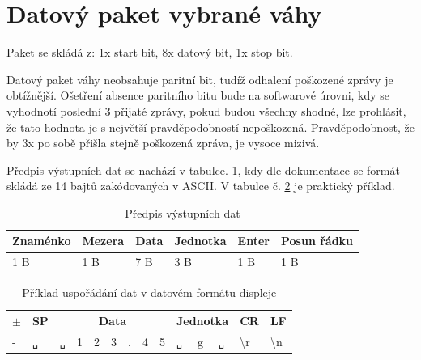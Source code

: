 \section{Datový paket vybrané váhy}
\label{datový paket váhy}

Paket se skládá z: 1x start bit, 8x datový bit, 1x stop bit.

Datový paket váhy neobsahuje paritní bit, tudíž odhalení poškozené zprávy je obtížnější. Ošetření absence paritního bitu bude na softwarové úrovni, kdy se vyhodnotí poslední 3 přijaté zprávy, pokud budou všechny shodné, lze prohlásit, že tato hodnota je s největší pravděpodobností nepoškozená. Pravděpodobnost, že by 3x po sobě přišla stejně poškozená zpráva, je vysoce mizivá.


Předpis výstupních dat se nachází v tabulce. \ref{tabos}, kdy dle dokumentace se formát skládá ze 14 bajtů zakódovaných v ASCII. V tabulce č. \ref{jouu} je praktický příklad.


\begin{table} [!h]
    \centering
    \begin{tabular}{|l|l|l|l|l|l|}
    \hline
         Znaménko    & Mezera & Data &  Jednotka & Enter & Posun řádku \\ \hline
         1 B & 1 B           & 7 B           & 3 B &1 B&1 B\\ \hline
    \end{tabular}
    \caption{Předpis výstupních dat}
    \label{tabos}
\end{table}




\begin{table}[h]
\centering
\begin{tabular}{|p{0.6cm}|p{0.6cm}|p{0.6cm}|p{0.6cm}|p{0.6cm}|p{0.6cm}|p{0.6cm}|p{0.6cm}|p{0.6cm}|p{0.6cm}|p{0.6cm}|p{0.6cm}|p{0.6cm}|p{0.6cm}|}
\hline
\(\pm\) & SP & \multicolumn{7}{c|}{Data} & \multicolumn{3}{c|}{Jednotka} & CR & LF \\ \hline
- & \verb|␣| & \verb|␣| & 1 & 2 & 3 & . & 4 & 5 & \verb|␣| & g & \verb|␣| & \textbackslash{r} & \textbackslash{n} \\ \hline
\end{tabular}
\caption{Příklad uspořádání dat v datovém formátu displeje}
\label{jouu}
\end{table}


